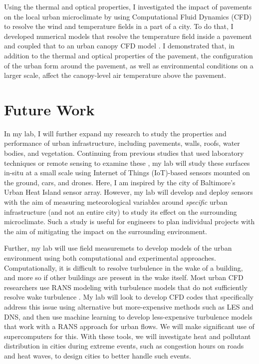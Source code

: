 \documentclass[12pt]{article}
\begin{document}
Using the thermal and optical properties, I investigated the impact of pavements on the local urban microclimate by using Computational Fluid Dynamics (CFD) to resolve the wind and temperature fields in a part of a city. To do that, I developed numerical models that resolve the temperature field inside a pavement \cite{sen2017microscale} and coupled that to an urban canopy CFD model \cite{sen2017uncoupled}. I demonstrated that, in addition to the thermal and optical properties of the pavement, the configuration of the urban form around the pavement, as well as environmental conditions on a larger scale, affect the canopy-level air temperature above the pavement. 

\section*{Future Work}
In my lab, I will further expand my research to study the properties and performance of urban infrastructure, including pavements, walls, roofs, water bodies, and vegetation. Continuing from previous studies that used laboratory techniques or remote sensing to examine these \cite{berdahl1997preliminary, niachou2001analysis, sun2012can, gallo1993use}, my lab will study these surfaces in-situ at a small scale using Internet of Things (IoT)-based sensors mounted on the ground, cars, and drones. Here, I am inspired by the city of Baltimore's Urban Heat Island sensor array. However, my lab will develop and deploy sensors with the aim of measuring meteorological variables around \textit{specific} urban infrastructure (and not an entire city) to study its effect on the surrounding microclimate. Such a study is useful for engineers to plan individual projects with the aim of mitigating the impact on the surrounding environment. 

Further, my lab will use field measuremets to develop models of the urban environment using both computational and experimental approaches. Computationally, it is difficult to resolve turbulence in the wake of a building, and more so if other buildings are present in the wake itself. Most urban CFD researchers use RANS modeling with turbulence models that do not sufficiently resolve wake turbulence \cite{blocken2015computational}. My lab will look to develop CFD codes that specifically address this issue using alternative but more-expensive methods such as LES and DNS, and then use machine learning to develop less-expensive turbulence models that work with a RANS approach for urban flows. We will make significant use of supercomputers for this. With these tools, we will investigate heat and pollutant distribution in cities during extreme events, such as congestion hours on roads and heat waves, to design cities to better handle such events.
\end{document}
